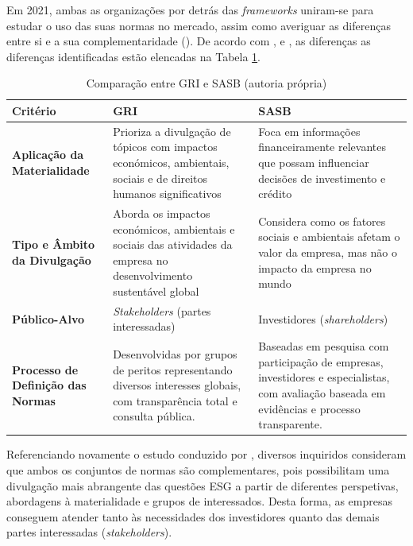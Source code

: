 Em 2021, ambas as organizações por detrás das \textit{frameworks} uniram-se para estudar o uso das suas normas no mercado, assim como averiguar as diferenças entre si e a sua complementaridade (\cite{GRISASB2021}). De acordo com \cite{GRISASB2021}, \cite{Pizzi2023} e \cite{Antolin-Lopez2023}, as diferenças as diferenças identificadas estão elencadas na Tabela \ref{tab:gri_sasb}.

\begin{table}[h]
    \centering
    \begin{tabular}{|p{2.5cm}|p{5.5cm}|p{5.5cm}|}
        \hline
        \textbf{Critério} & \textbf{GRI} & \textbf{SASB} \\
        \hline
        \textbf{Aplicação da Materialidade} & Prioriza a divulgação de tópicos com impactos económicos, ambientais, sociais e de direitos humanos significativos & Foca em informações financeiramente relevantes que possam influenciar decisões de investimento e crédito \\
        \hline
        \textbf{Tipo e Âmbito da Divulgação} & Aborda os impactos económicos, ambientais e sociais das atividades da empresa no desenvolvimento sustentável global & Considera como os fatores sociais e ambientais afetam o valor da empresa, mas não o impacto da empresa no mundo \\
        \hline
        \textbf{Público-Alvo} & \textit{Stakeholders} (partes interessadas) & Investidores (\textit{shareholders}) \\
        \hline
        \textbf{Processo de Definição das Normas} & Desenvolvidas por grupos de peritos representando diversos interesses globais, com transparência total e consulta pública. & Baseadas em pesquisa com participação de empresas, investidores e especialistas, com avaliação baseada em evidências e processo transparente. \\
        \hline
    \end{tabular}
    \caption{Comparação entre GRI e SASB (autoria própria)}
    \label{tab:gri_sasb}
\end{table}

Referenciando novamente o estudo conduzido por \cite{GRISASB2021}, diversos inquiridos consideram que ambos os conjuntos de normas são complementares, pois possibilitam uma divulgação mais abrangente das questões \gls{ESG} a partir de diferentes perspetivas, abordagens à materialidade e grupos de interessados. Desta forma, as empresas conseguem atender tanto às necessidades dos investidores quanto das demais partes interessadas (\textit{stakeholders}).


